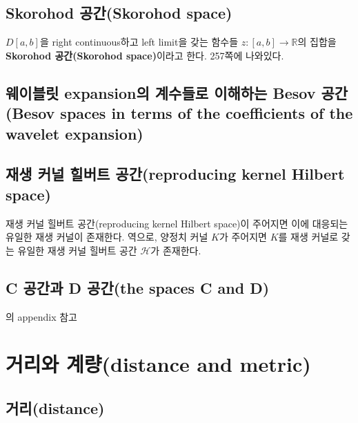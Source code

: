 \documentclass[b5paper,]{scrbook}
\theoremstyle{plain}
\theoremstyle{definition}
\numberwithin{equation}{section}
\begin{document}
\hypertarget{skorohod-skorohod-space}{%
\subsection{Skorohod 공간(Skorohod space)}\label{skorohod-skorohod-space}}

\(D[a,b]\)을 right continuous하고 left limit을 갖는 함수들 \(z:[a,b]\rightarrow \mathbb{R}\)의 집합을 \textbf{Skorohod 공간(Skorohod space)}이라고 한다. \citep{VanderVaart2000} 257쪽에 나와있다.

\hypertarget{-expansion---besov-besov-spaces-in-terms-of-the-coefficients-of-the-wavelet-expansion}{%
\subsection{웨이블릿 expansion의 계수들로 이해하는 Besov 공간(Besov spaces in terms of the coefficients of the wavelet expansion)}\label{-expansion---besov-besov-spaces-in-terms-of-the-coefficients-of-the-wavelet-expansion}}

\hypertarget{---reproducing-kernel-hilbert-space}{%
\subsection{재생 커널 힐버트 공간(reproducing kernel Hilbert space)}\label{---reproducing-kernel-hilbert-space}}

재생 커널 힐버트 공간(reproducing kernel Hilbert space)이 주어지면 이에 대응되는 유일한 재생 커널이 존재한다. 역으로, 양정치 커널 \(K\)가 주어지면 \(K\)를 재생 커널로 갖는 유일한 재생 커널 힐버트 공간 \(\mathcal{H}\)가 존재한다.

\hypertarget{c--d-the-spaces-c-and-d}{%
\subsection{C 공간과 D 공간(the spaces C and D)}\label{c--d-the-spaces-c-and-d}}

\citep{Beran2013}의 appendix 참고

\hypertarget{-distance-and-metric}{%
\section{거리와 계량(distance and metric)}\label{-distance-and-metric}}

\hypertarget{distance}{%
\subsection{거리(distance)}\label{distance}}
\end{document}
